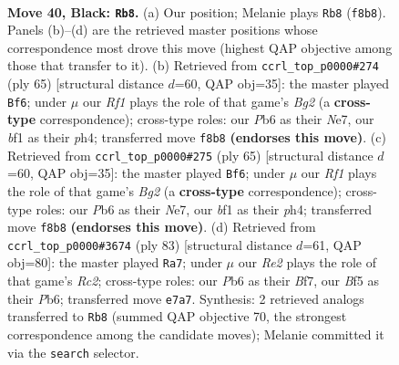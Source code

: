 \documentclass[11pt]{article}
\begin{document}
\clearpage

\begin{figure}[p]\centering
\begin{subfigure}{0.46\textwidth}\centering
\resizebox{\linewidth}{!}{%
\newchessgame
\chessboard[
  setfen={5r2/4r1k1/1p6/p1p1nb2/P5p1/1NP3P1/K6P/4RBNR b - - 2 40},
  showmover=false,
  pgfstyle=straightmove, color=movearrow, markmove={f8-b8}
]}
\caption{}
\end{subfigure}\hfill
\begin{subfigure}{0.46\textwidth}\centering
\resizebox{\linewidth}{!}{%
\newchessgame
\chessboard[
  setfen={4b2k/r3n1b1/4p1p1/3pN3/6PP/p1P5/R5K1/1B2R3 b - - 3 33},
  showmover=false,
  pgfstyle=straightmove, color=movearrow, markmove={g7-f6}
]}
\caption{}
\end{subfigure}
\\[4pt]
\begin{subfigure}{0.46\textwidth}\centering
\resizebox{\linewidth}{!}{%
\newchessgame
\chessboard[
  setfen={4b2k/r3n1b1/4p1p1/3pN3/6PP/p1P5/R5K1/1B2R3 b - - 1 33},
  showmover=false,
  pgfstyle=straightmove, color=movearrow, markmove={g7-f6}
]}
\caption{}
\end{subfigure}\hfill
\begin{subfigure}{0.46\textwidth}\centering
\resizebox{\linewidth}{!}{%
\newchessgame
\chessboard[
  setfen={6k1/2r2b2/1p4p1/2n2p1p/P3pN1P/4P1P1/5P2/2R2BK1 b - - 0 42},
  showmover=false,
  pgfstyle=straightmove, color=movearrow, markmove={c7-a7}
]}
\caption{}
\end{subfigure}
\caption{\textbf{Move 40, Black: \texttt{Rb8}.} (a) Our position; Melanie plays \texttt{Rb8} (\texttt{f8b8}). Panels (b)--(d) are the retrieved master positions whose correspondence most drove this move (highest QAP objective among those that transfer to it). (b) Retrieved from \texttt{ccrl\_top\_p0000\#274} (ply 65) [structural distance $d$=60, QAP obj=35]: the master played \texttt{Bf6}; under $\mu$ our \emph{Rf1} plays the role of that game's \emph{Bg2} (a \textbf{cross-type} correspondence); cross-type roles: our \emph{P}b6 as their \emph{N}e7, our \emph{b}f1 as their \emph{p}h4; transferred move \texttt{f8b8} \textbf{(endorses this move)}. (c) Retrieved from \texttt{ccrl\_top\_p0000\#275} (ply 65) [structural distance $d$=60, QAP obj=35]: the master played \texttt{Bf6}; under $\mu$ our \emph{Rf1} plays the role of that game's \emph{Bg2} (a \textbf{cross-type} correspondence); cross-type roles: our \emph{P}b6 as their \emph{N}e7, our \emph{b}f1 as their \emph{p}h4; transferred move \texttt{f8b8} \textbf{(endorses this move)}. (d) Retrieved from \texttt{ccrl\_top\_p0000\#3674} (ply 83) [structural distance $d$=61, QAP obj=80]: the master played \texttt{Ra7}; under $\mu$ our \emph{Re2} plays the role of that game's \emph{Rc2}; cross-type roles: our \emph{P}b6 as their \emph{B}f7, our \emph{B}f5 as their \emph{P}b6; transferred move \texttt{e7a7}. Synthesis: 2 retrieved analogs transferred to \texttt{Rb8} (summed QAP objective 70, the strongest correspondence among the candidate moves); Melanie committed it via the \texttt{search} selector.}
\label{fig:thought-m79}
\end{figure}
\end{document}
